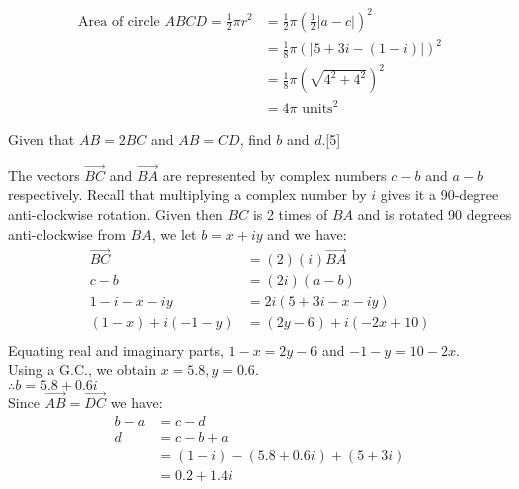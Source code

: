 \documentclass[12pt, a4 paper]{article}
\begin{document}
\begin{outline}[enumerate]
\begin{answer}
		\begin{align*}
			\textrm{Area of circle }ABCD = \frac{1}{2}\pi r^2
			  & = \frac{1}{2}\pi (\frac{1}{2}|a-c|)^2 \\
			  & = \frac{1}{8}\pi (|5+3i-(1-i)|)^2     \\
			  & = \frac{1}{8}\pi (\sqrt{4^2 + 4^2})^2 \\
			  & = 4\pi \textrm{ units}^2              
		\end{align*}
	\end{answer}        
	\2 Given that $AB=2BC$ and $AB=CD$, find $b$ and $d$.\hfill[5]
	\begin{answer}
		The vectors $\overrightarrow {BC}$ and $\overrightarrow {BA}$ are represented by complex numbers $c-b$ and $a-b$ respectively. Recall that multiplying a complex number by $i$ gives it a 90-degree anti-clockwise rotation. Given then $BC$ is 2 times of $BA$ and is rotated 90 degrees anti-clockwise from $BA$, we let $b=x+iy$ and we have:
		\begin{align*}
			\overrightarrow {BC} & = (2)(i)\overrightarrow {BA} \\
			c-b                  & = (2i)(a-b)                  \\
			1-i-x-iy             & = 2i(5+3i-x-iy)              \\
			(1-x)+i(-1-y)        & =(2y-6)+i(-2x+10)            \\
		\end{align*}
		Equating real and imaginary parts, $1-x=2y-6$ and $-1-y=10-2x$.\\
		Using a G.C., we obtain $x=5.8,y=0.6$.\\
		$\therefore b=5.8+0.6i$\\
		Since $\overrightarrow {AB} = \overrightarrow {DC}$ we have:
		\begin{align*}
			b-a & = c-d                     \\
			d   & = c-b+a                   \\
			    & = (1-i)-(5.8+0.6i)+(5+3i) \\
			    & = 0.2+1.4i                
		\end{align*}
	\end{answer}
\end{outline}
\end{document}

